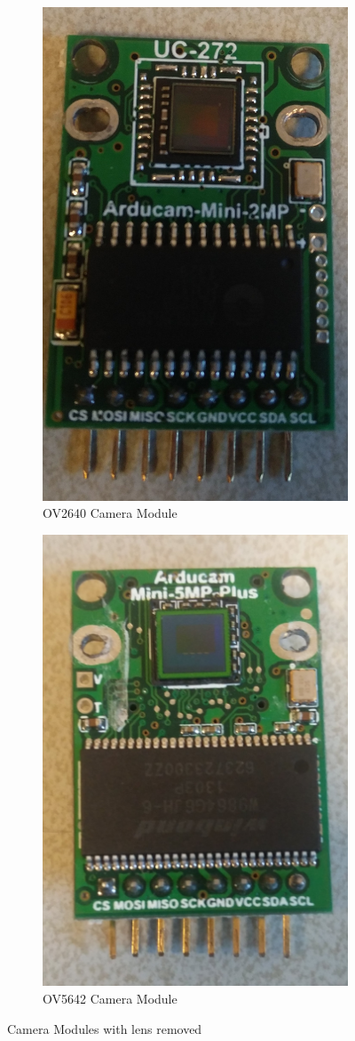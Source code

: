 \begin{figure}[ht]
\centering
    \begin{subfigure}{0.75\textwidth}
    \centering
        \includegraphics[width=0.25\linewidth]{pics/OV2640}
        \caption{OV2640 Camera Module}
    \end{subfigure}%
   
    \begin{subfigure}{\textwidth}
    \centering
        \includegraphics[width=0.25\linewidth]{pics/OV5642}
        \caption{OV5642 Camera Module}
    \end{subfigure}
       \caption{Camera Modules with lens removed}
        \label{fig:camera_modules}
   \end{figure}
   
   